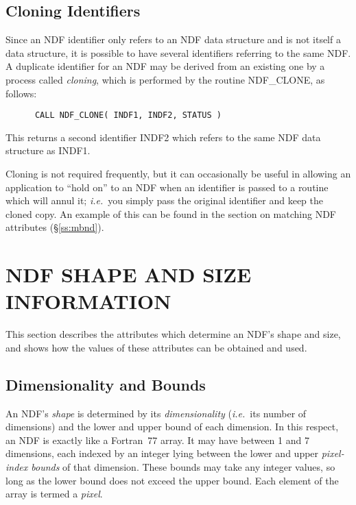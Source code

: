 \documentclass[twoside,11pt]{article}
\newcommand{\htmlref}[2]{#1}
\newcommand{\xlabel}[1]{}
\newcommand{\st}[1]{{\em{#1}}}
\begin{document}
\subsection{\xlabel{cloning_identifiers}Cloning Identifiers}

Since an NDF identifier only refers to an NDF data structure and is not
itself a data structure, it is possible to have several identifiers
referring to the same NDF. 
A duplicate identifier for an NDF may be derived from an existing one by a
process called \st{cloning}, which is performed by the routine \htmlref{NDF\_CLONE}{NDF_CLONE}, as
follows:

\small
\begin{verbatim}
      CALL NDF_CLONE( INDF1, INDF2, STATUS )
\end{verbatim}
\normalsize

This returns a second identifier INDF2 which refers to the same NDF data 
structure as INDF1.

Cloning is not required frequently, but it can occasionally be useful in
allowing an application to ``hold on'' to an NDF when an identifier is passed to
a routine which will annul it; \st{i.e.}\ you simply pass the original
identifier and keep the cloned copy.
An example of this can be found in the section on matching NDF attributes 
(\S\ref{ss:mbnd}).


\section{\xlabel{ndf_shape_and_size_information}NDF SHAPE AND SIZE INFORMATION}

This section describes the attributes which determine an NDF's shape and
size, and shows how the values of these attributes can be obtained and used.

\subsection{\xlabel{dimensionality_and_bounds}Dimensionality and Bounds}

An NDF's \st{shape\/} is determined by its \st{dimensionality\/}
(\st{i.e.}\ its number of dimensions) and the lower and upper bound of
each 
dimension. 
In this respect, an NDF is exactly like a Fortran~77 array.
It may have between 1 and 7 dimensions, each indexed by an integer lying between
the lower and upper \st{pixel-index bounds\/} of that dimension. 
These bounds may take any integer values, so long as the lower bound does not
exceed the upper bound. 
Each element of the array is termed a \st{pixel}.
\end{document}
